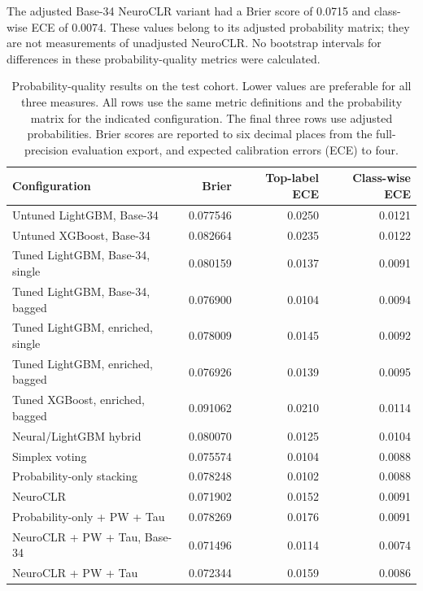 The adjusted Base-34 NeuroCLR variant had a Brier score of 0.0715 and class-wise ECE of 0.0074. These values belong to its adjusted probability matrix; they are not measurements of unadjusted NeuroCLR. No bootstrap intervals for differences in these probability-quality metrics were calculated.

\begin{table}[htbp]
\centering
\caption{Probability-quality results on the test cohort. Lower values are preferable for all three measures. All rows use the same metric definitions and the probability matrix for the indicated configuration. The final three rows use adjusted probabilities. Brier scores are reported to six decimal places from the full-precision evaluation export, and expected calibration errors (ECE) to four.}
\label{tab:test_probability}
\begingroup
\small
\setlength{\tabcolsep}{4pt}
\begin{tabular}{@{}p{6.2cm}rrr@{}}
\toprule
Configuration & Brier & Top-label ECE & Class-wise ECE \\
\midrule
Untuned LightGBM, Base-34 & 0.077546 & 0.0250 & 0.0121 \\
Untuned XGBoost, Base-34 & 0.082664 & 0.0235 & 0.0122 \\
Tuned LightGBM, Base-34, single & 0.080159 & 0.0137 & 0.0091 \\
Tuned LightGBM, Base-34, bagged & 0.076900 & 0.0104 & 0.0094 \\
Tuned LightGBM, enriched, single & 0.078009 & 0.0145 & 0.0092 \\
Tuned LightGBM, enriched, bagged & 0.076926 & 0.0139 & 0.0095 \\
Tuned XGBoost, enriched, bagged & 0.091062 & 0.0210 & 0.0114 \\
Neural/LightGBM hybrid & 0.080070 & 0.0125 & 0.0104 \\
Simplex voting & 0.075574 & 0.0104 & 0.0088 \\
Probability-only stacking & 0.078248 & 0.0102 & 0.0088 \\
NeuroCLR & 0.071902 & 0.0152 & 0.0091 \\
\midrule
Probability-only + PW + Tau & 0.078269 & 0.0176 & 0.0091 \\
NeuroCLR + PW + Tau, Base-34 & 0.071496 & 0.0114 & 0.0074 \\
NeuroCLR + PW + Tau & 0.072344 & 0.0159 & 0.0086 \\
\bottomrule
\end{tabular}
\endgroup
\end{table}

